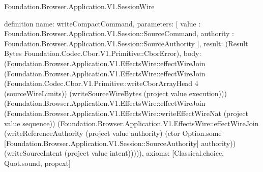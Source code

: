 \begin{lexlean}{Foundation.Browser.Application.V1.SessionWire}
\begin{semanticmodule}
definition{
  name: writeCompactCommand,
  parameters: [
    value : Foundation.Browser.Application.V1.Session::SourceCommand,
    authority : Foundation.Browser.Application.V1.Session::SourceAuthority
  ],
  result: (Result Bytes Foundation.Codec.Cbor.V1.Primitive::CborError),
  body: (Foundation.Browser.Application.V1.EffectsWire::effectWireJoin (Foundation.Browser.Application.V1.EffectsWire::effectWireJoin (Foundation.Codec.Cbor.V1.Primitive::writeCborArrayHead 4 (sourceWireLimits)) (writeSourceWireBytes (project value execution))) (Foundation.Browser.Application.V1.EffectsWire::effectWireJoin (Foundation.Browser.Application.V1.EffectsWire::writeEffectWireNat (project value sequence)) (Foundation.Browser.Application.V1.EffectsWire::effectWireJoin (writeReferenceAuthority (project value authority) (ctor Option.some [Foundation.Browser.Application.V1.Session::SourceAuthority] authority)) (writeSourceIntent (project value intent))))),
  axioms: [Classical.choice, Quot.sound, propext]
}


\end{semanticmodule}
\end{lexlean}

